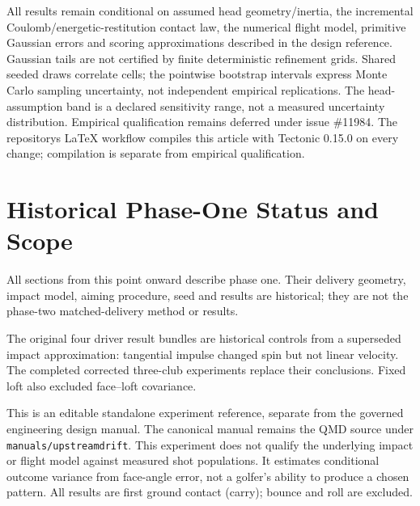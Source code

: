 \documentclass[11pt,letterpaper]{article}
\begin{document}
All results remain conditional on assumed head geometry/inertia, the incremental Coulomb/energetic-restitution contact law, the numerical flight model, primitive Gaussian errors and scoring approximations described in the design reference. Gaussian tails are not certified by finite deterministic refinement grids. Shared seeded draws correlate cells; the pointwise bootstrap intervals express Monte Carlo sampling uncertainty, not independent empirical replications. The head-assumption band is a declared sensitivity range, not a measured uncertainty distribution. Empirical qualification remains deferred under issue \#11984. The repository\textquotesingle s LaTeX workflow compiles this article with Tectonic 0.15.0 on every change; compilation is separate from empirical qualification.

\clearpage
\appendix
\section{Historical Phase-One Status and Scope}
All sections from this point onward describe phase one. Their delivery
geometry, impact model, aiming procedure, seed and results are historical;
they are not the phase-two matched-delivery method or results.

The original four driver result bundles are historical controls from a
superseded impact approximation: tangential impulse changed spin but not
linear velocity. The completed corrected three-club experiments replace their
conclusions. Fixed loft also excluded face--loft covariance.

This is an editable standalone experiment reference, separate from the governed
engineering design manual. The canonical manual remains the QMD source under
\texttt{manuals/upstreamdrift}. This experiment does not qualify the underlying
impact or flight model against measured shot populations. It estimates
conditional outcome variance from face-angle error, not a golfer's ability to
produce a chosen pattern. All results are first ground contact (carry); bounce
and roll are excluded.
\end{document}
